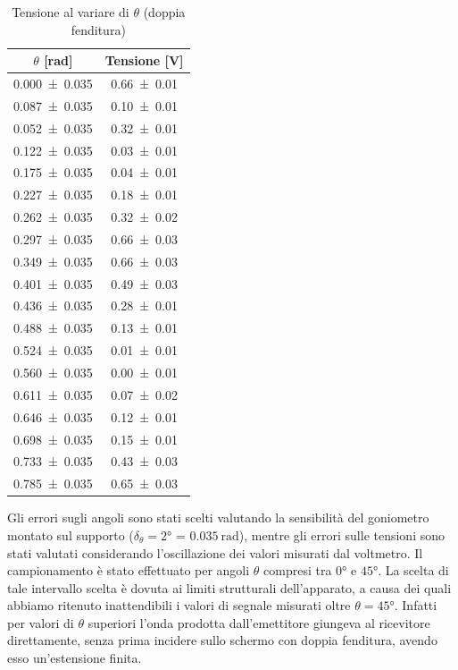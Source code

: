 \documentclass[a4paper]{article}
\begin{document}
\begin{table}[H]
\centering
\caption{Tensione al variare di $\theta$ (doppia fenditura)}
\label{tab:dati_doppia_fenditura}
\begin{tabular}{|c|c|}
\hline
$\theta$ [\si{\radian}] & Tensione [\si{\volt}] \\
\hline
\num{0.000 \pm 0.035} & \num{0.66 \pm 0.01} \\
\num{0.087 \pm 0.035} & \num{0.10 \pm 0.01} \\
\num{0.052 \pm 0.035} & \num{0.32 \pm 0.01} \\
\num{0.122 \pm 0.035} & \num{0.03 \pm 0.01} \\
\num{0.175 \pm 0.035} & \num{0.04 \pm 0.01} \\
\num{0.227 \pm 0.035} & \num{0.18 \pm 0.01} \\
\num{0.262 \pm 0.035} & \num{0.32 \pm 0.02} \\
\num{0.297 \pm 0.035} & \num{0.66 \pm 0.03} \\
\num{0.349 \pm 0.035} & \num{0.66 \pm 0.03} \\
\num{0.401 \pm 0.035} & \num{0.49 \pm 0.03} \\
\num{0.436 \pm 0.035} & \num{0.28 \pm 0.01} \\
\num{0.488 \pm 0.035} & \num{0.13 \pm 0.01} \\
\num{0.524 \pm 0.035} & \num{0.01 \pm 0.01} \\
\num{0.560 \pm 0.035} & \num{0.00 \pm 0.01} \\
\num{0.611 \pm 0.035} & \num{0.07 \pm 0.02} \\
\num{0.646 \pm 0.035} & \num{0.12 \pm 0.01} \\
\num{0.698 \pm 0.035} & \num{0.15 \pm 0.01} \\
\num{0.733 \pm 0.035} & \num{0.43 \pm 0.03} \\
\num{0.785 \pm 0.035} & \num{0.65 \pm 0.03} \\
\hline
\end{tabular}
\end{table}
Gli errori sugli angoli sono stati scelti valutando la sensibilità del goniometro montato sul supporto ($\delta_{\theta} = \ang{2}$ = $\SI{0.035}{\radian}$), mentre gli errori sulle tensioni sono stati valutati considerando l'oscillazione dei valori misurati dal voltmetro. Il campionamento è stato effettuato per angoli $\theta$ compresi tra $\ang{0}$ e $\ang{45}$. La scelta di tale intervallo scelta è dovuta ai limiti strutturali dell'apparato, a causa dei quali abbiamo ritenuto inattendibili i valori di segnale misurati oltre $\theta=\ang{45}$. Infatti per valori di $\theta$ superiori l'onda prodotta dall'emettitore giungeva al ricevitore direttamente, senza prima incidere sullo schermo con doppia fenditura, avendo esso un'estensione finita.
\end{document}
